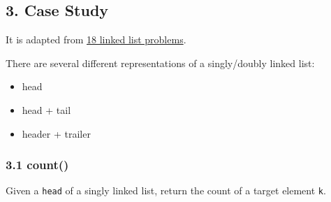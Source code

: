 \documentclass[aspectratio=169, 14pt]{beamer}
\begin{document}
\begin{frame}
    \section{\textcolor{darkmidnightblue}{3. Case Study}}
    It is adapted from \href{http://cslibrary.stanford.edu/105/LinkedListProblems.pdf}{18 linked list problems}.
\end{frame}

{
\begin{frame}[standout]
  There are several different representations of a singly/doubly linked list:
  \begin{itemize}
    \item head
    \item head + tail
    \item header + trailer
  \end{itemize}
\end{frame}
}

\begin{frame}
    \frametitle{3.1 count()}
Given a \alert{\texttt{head}} of a singly linked list, return the count of a target element \texttt{k}.    

\pause
{}
\end{frame}
\end{document}
